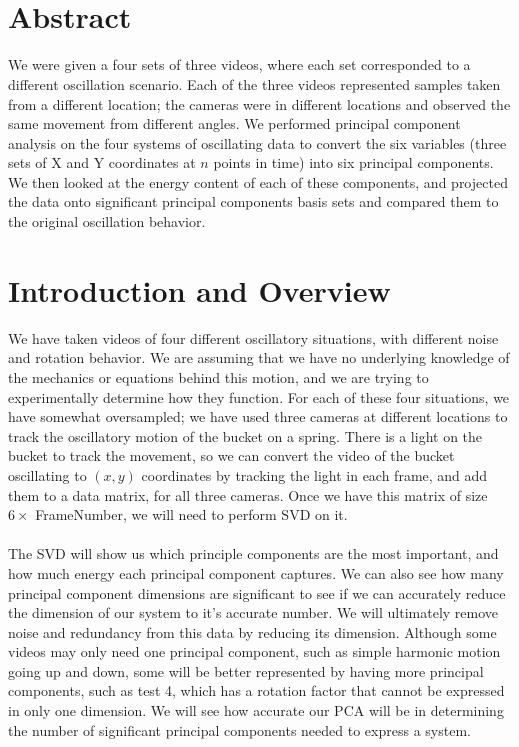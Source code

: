 \documentclass{article}
\title{
    \textmd{\textbf{\text{ } \hmwkTitle}}\\
}
\author{\hmwkAuthorName}
\date{}
\begin{document}
\maketitle

\section*{\fontsize{19}{15}\selectfont Abstract}
		We were given a four sets of three videos, where each set corresponded to a different oscillation scenario. Each of the three videos represented samples taken from a different location; the cameras were in different locations and observed the same movement from different angles. We performed principal component analysis on the four systems of oscillating data to convert the six variables (three sets of X and Y coordinates at $n$ points in time) into six principal components. We then looked at the energy content of each of these components, and projected the data onto significant principal components basis sets and compared them to the original oscillation behavior.
\section*{\fontsize{19}{15}\selectfont Introduction and Overview}
	We have taken videos of four different oscillatory situations, with different noise and rotation behavior. We are assuming that we have no underlying knowledge of the mechanics or equations behind this motion, and we are trying to experimentally determine how they function. For each of these four situations, we have somewhat oversampled; we have used three cameras at different locations to track the oscillatory motion of the bucket on a spring. There is a light on the bucket to track the movement, so we can convert the video of the bucket oscillating to $(x,y)$ coordinates by tracking the light in each frame, and add them to a data matrix, for all three cameras. 
	Once we have this matrix of size $6 \times$ FrameNumber, we will need to perform SVD on it. \\ \\
The SVD will show us which principle components are the most important, and how much energy each principal component captures. We can also see how many principal component dimensions are significant to see if we can accurately reduce the dimension of our system to it's accurate number. We will ultimately remove noise and redundancy from this data by reducing its dimension.
	Although some videos may only need one principal component, such as simple harmonic motion going up and down, some will be better represented by having more principal components, such as test 4, which has a rotation factor that cannot be expressed in only one dimension. We will see how accurate our PCA will be in determining the number of significant principal components needed to express a system.
\end{document}
